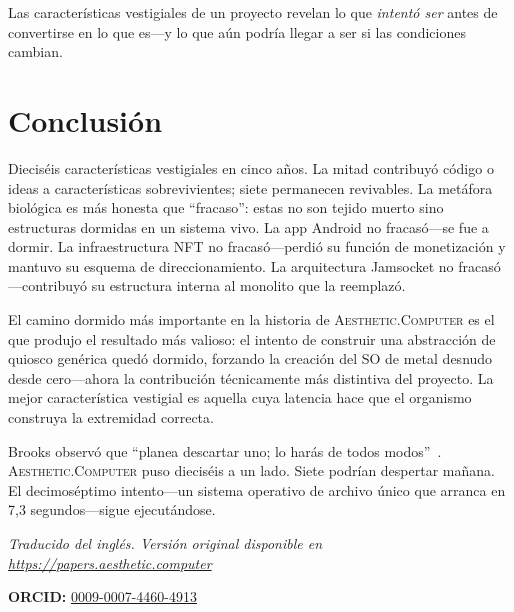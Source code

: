\documentclass[10pt,letterpaper,twocolumn]{article}
\newcommand{\ac}{\textsc{Aesthetic.Computer}}
\begin{document}
Las características vestigiales de un proyecto revelan lo que \emph{intentó ser} antes de convertirse en lo que es---y lo que aún podría llegar a ser si las condiciones cambian.

\section{Conclusión}

Dieciséis características vestigiales en cinco años. La mitad contribuyó código o ideas a características sobrevivientes; siete permanecen revivables. La metáfora biológica es más honesta que ``fracaso'': estas no son tejido muerto sino estructuras dormidas en un sistema vivo. La app Android no fracasó---se fue a dormir. La infraestructura NFT no fracasó---perdió su función de monetización y mantuvo su esquema de direccionamiento. La arquitectura Jamsocket no fracasó---contribuyó su estructura interna al monolito que la reemplazó.

El camino dormido más importante en la historia de \ac{} es el que produjo el resultado más valioso: el intento de construir una abstracción de quiosco genérica quedó dormido, forzando la creación del SO de metal desnudo desde cero---ahora la contribución técnicamente más distintiva del proyecto. La mejor característica vestigial es aquella cuya latencia hace que el organismo construya la extremidad correcta.

Brooks observó que ``planea descartar uno; lo harás de todos modos''~\citep{brooks1975mythical}. \ac{} puso dieciséis a un lado. Siete podrían despertar mañana. El decimoséptimo intento---un sistema operativo de archivo único que arranca en 7,3 segundos---sigue ejecutándose.

\vspace{0.5em}
\noindent\textit{Traducido del inglés. Versión original disponible en \url{https://papers.aesthetic.computer}}

\vspace{0.5em}
\noindent\textbf{ORCID:} \href{https://orcid.org/0009-0007-4460-4913}{0009-0007-4460-4913}



\end{document}
